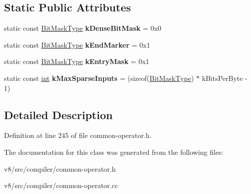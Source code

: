 \subsection*{Static Public Attributes}
\begin{DoxyCompactItemize}
\item 
\mbox{\label{classv8_1_1internal_1_1compiler_1_1SparseInputMask_a479a05803df2d18cf04ca9c01b5e8bc2}} 
static const \mbox{\hyperlink{classuint32__t}{Bit\+Mask\+Type}} {\bfseries k\+Dense\+Bit\+Mask} = 0x0
\item 
\mbox{\label{classv8_1_1internal_1_1compiler_1_1SparseInputMask_a45d2e83825d7ec320444984f8d12d402}} 
static const \mbox{\hyperlink{classuint32__t}{Bit\+Mask\+Type}} {\bfseries k\+End\+Marker} = 0x1
\item 
\mbox{\label{classv8_1_1internal_1_1compiler_1_1SparseInputMask_ac5e1fce692dfcf47a716630c04552df2}} 
static const \mbox{\hyperlink{classuint32__t}{Bit\+Mask\+Type}} {\bfseries k\+Entry\+Mask} = 0x1
\item 
\mbox{\label{classv8_1_1internal_1_1compiler_1_1SparseInputMask_a400da3fae78d0c3a69ff3bf74306b462}} 
static const \mbox{\hyperlink{classint}{int}} {\bfseries k\+Max\+Sparse\+Inputs} = (sizeof(\mbox{\hyperlink{classuint32__t}{Bit\+Mask\+Type}}) $\ast$ k\+Bits\+Per\+Byte -\/ 1)
\end{DoxyCompactItemize}


\subsection{Detailed Description}


Definition at line 245 of file common-\/operator.\+h.



The documentation for this class was generated from the following files\+:\begin{DoxyCompactItemize}
\item 
v8/src/compiler/common-\/operator.\+h\item 
v8/src/compiler/common-\/operator.\+cc\end{DoxyCompactItemize}
